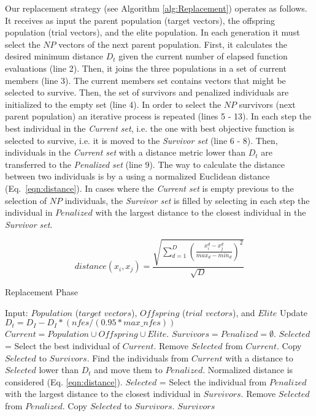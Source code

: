 Our replacement strategy (see Algorithm \ref{alg:Replacement}) operates as follows.
%
It receives as input the parent population (target vectors), the offspring population (trial vectors), and the elite population.
%
In each generation it must select the $NP$ vectors of the next parent population.
%
First, it calculates the desired minimum distance $D_t$ given the current number of elapsed function evaluations (line 2).
%
Then, it joins the three populations in a set of current members (line 3).
%
The current members set contains vectors that might be selected to survive.
%
Then, the set of survivors and penalized individuals are initialized to the empty set (line 4).
%
In order to select the $NP$ survivors (next parent population) an iterative process is repeated (lines 5 - 13).
%
In each step the best individual in the \textit{Current set}, i.e. the one with best objective function is selected
to survive, i.e. it is moved to the \textit{Survivor set} (line 6 - 8).
%
Then, individuals in the \textit{Current set} with a distance metric lower than $D_t$ are transferred to the \textit{Penalized set} (line 9).
%
The way to calculate the distance between two individuals is by a using a normalized Euclidean distance (Eq.~\ref{eqn:distance}).
%
%
In cases where the \textit{Current set} is empty previous to the selection of $NP$ individuals, the \textit{Survivor set} is filled by selecting in each step 
the individual in $Penalized$ with the largest distance to the closest individual in the \textit{Survivor set}.

\begin{equation}\label{eqn:distance}
distance ( x_{i}, x_j ) = \frac{\sqrt{ \sum_{d=1}^D \left ( \frac{x_{i}^d - x_j^d}{max_d - min_d} \right )^2  }} {\sqrt{D}}
\end{equation}


\begin{algorithm}[t]
  \scriptsize
	\caption{Replacement Phase} \label{alg:Replacement}
	\begin{algorithmic}[1]
	\STATE Input: $Population$ ($target$ $vectors$), $Offspring$ ($trial$ $vectors$), and $Elite$
	\STATE Update $D_t = D_I - D_I *(nfes/(0.95*max\_nfes)) $ 
	\STATE $Current = Population \cup Offspring \cup Elite$.
	\STATE $Survivors = Penalized = \emptyset$.
	   \STATE $Selected$ = Select the best individual of $Current$.
		 \STATE Remove $Selected$ from $Current$.
	   \STATE Copy $Selected$ to $Survivors$.
	   \STATE Find the individuals from $Current$ with a distance to $Selected$ lower than $D_t$ and move them to $Penalized$. Normalized distance is considered (Eq. \ref{eqn:distance}).
	\ENDWHILE
	   \STATE $Selected$ = Select the individual from $Penalized$ with the largest distance to the closest individual in $Survivors$.
		 \STATE Remove $Selected$ from $Penalized$.
	   \STATE Copy $Selected$ to $Survivors$.
	\ENDWHILE
  \RETURN $Survivors$
\end{algorithmic}
\end{algorithm}


